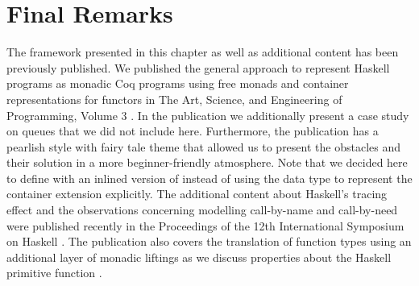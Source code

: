 \section{Final Remarks}

The framework presented in this chapter as well as additional content has been previously published.
We published the general approach to represent Haskell programs as monadic Coq programs using free monads and container representations for functors in The Art, Science, and Engineering of Programming, Volume 3 \citep{dylus2019one}.
In the publication we additionally present a case study on queues that we did not include here.
Furthermore, the publication has a pearlish style with fairy tale theme that allowed us to present the obstacles and their solution in a more beginner-friendly atmosphere.
Note that we decided here to define  with an inlined version of  instead of using the data type to represent the container extension explicitly.
The additional content about Haskell's tracing effect and the observations concerning modelling call-by-name and call-by-need were published recently in the Proceedings of the 12th International Symposium on Haskell \citep{christiansen2019verifying}.
The publication also covers the translation of function types using an additional layer of monadic liftings as we discuss properties about the Haskell primitive function .
